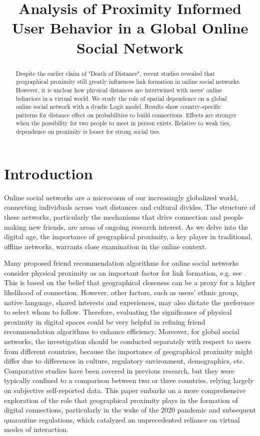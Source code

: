 
\title{Analysis of Proximity Informed User
Behavior in a Global Online Social Network}
\maketitle

\begin{abstract}
Despite the earlier claim of "Death of Distance", recent studies revealed that geographical proximity still greatly influences link formation in online social networks. However, it is unclear how physical distances are intertwined with users' online behaviors in a virtual world. We study the role of spatial dependence on a global online social network with a dyadic Logit model. Results show country-specific patterns for distance effect on probabilities to build connections. Effects are stronger when the possibility for two people to meet in person exists. Relative to weak ties, dependence on proximity is looser for strong social ties.
\end{abstract}


\section{Introduction}

Online social networks are a microcosm of our increasingly globalized world, connecting individuals across vast distances and cultural divides. The structure of these networks, particularly the mechanisms that drive connection and people making new friends, are areas of ongoing research interest. As we delve into the digital age, the importance of geographical proximity, a key player in traditional, offline networks, warrants close examination in the online context.

Many proposed friend recommendation algorithms for online social networks consider physical proximity as an important factor for link formation, e.g. see \cite{xie2010potential, chin2013should, chin2012linking,wang2011interplay}. This is based on the belief that geographical closeness can be a proxy for a higher likelihood of connection. However, other factors, such as users' ethnic group, native language, shared interests and experiences, may also dictate the preference to select whom to follow. Therefore, evaluating the significance of physical proximity in digital spaces could be very helpful in refining friend recommendation algorithms to enhance efficiency. Moreover, for global social networks, the investigation should be conducted separately with respect to users from different countries, because the importance of geographical proximity might differ due to differences in culture, regulatory environment, demographics, etc. Comparative studies have been covered in previous research, but they were typically confined to a comparison between two or three countries, relying largely on subjective self-reported data. This paper embarks on a more comprehensive exploration of the role that geographical proximity plays in the formation of digital connections, particularly in the wake of the 2020 pandemic and subsequent quarantine regulations, which catalyzed an unprecedented reliance on virtual modes of interaction.

